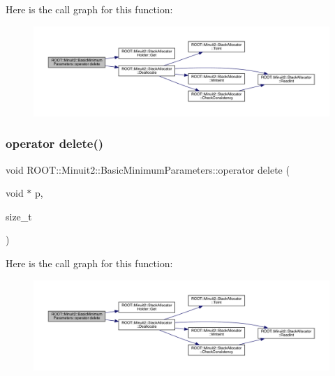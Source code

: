 Here is the call graph for this function\+:
\nopagebreak
\begin{figure}[H]
\begin{center}
\leavevmode
\includegraphics[width=350pt]{da/d30/classROOT_1_1Minuit2_1_1BasicMinimumParameters_aaaef6d3167e6f4a88182d6f171641fb9_cgraph}
\end{center}
\end{figure}
\mbox{\label{classROOT_1_1Minuit2_1_1BasicMinimumParameters_aaaef6d3167e6f4a88182d6f171641fb9}} 
\subsubsection{\texorpdfstring{operator delete()}{operator delete()}\hspace{0.1cm}{\footnotesize\ttfamily [3/3]}}
{\footnotesize\ttfamily void R\+O\+O\+T\+::\+Minuit2\+::\+Basic\+Minimum\+Parameters\+::operator delete (\begin{DoxyParamCaption}\item[{void $\ast$}]{p,  }\item[{size\+\_\+t}]{ }\end{DoxyParamCaption})\hspace{0.3cm}{\ttfamily [inline]}}

Here is the call graph for this function\+:
\nopagebreak
\begin{figure}[H]
\begin{center}
\leavevmode
\includegraphics[width=350pt]{da/d30/classROOT_1_1Minuit2_1_1BasicMinimumParameters_aaaef6d3167e6f4a88182d6f171641fb9_cgraph}
\end{center}
\end{figure}
\mbox{\label{classROOT_1_1Minuit2_1_1BasicMinimumParameters_a5258a9959c0b6ff699a9200dad4caee0}} 
